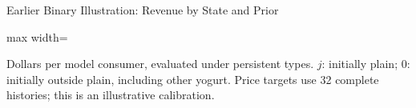 \documentclass[aspectratio=169,professionalfonts]{beamer}
\newcommand{\shortbuttons}{}
\begin{document}
\gdef\shortbuttons{\hyperlink{short-34}{\beamergotobutton{Back to Revised Exercise}}}
\begin{frame}[label=short-plain-info-table,noframenumbering]{Earlier Binary Illustration: Revenue by State and Prior}
  \centering\small
  \begin{adjustbox}{max width=\linewidth}
    
  \end{adjustbox}
  \par\medskip\footnotesize Dollars per model consumer, evaluated under persistent types.
  $j$: initially plain; $0$: initially outside plain, including other yogurt.
  Price targets use 32 complete histories; this is an illustrative calibration.
\end{frame}
\end{document}
